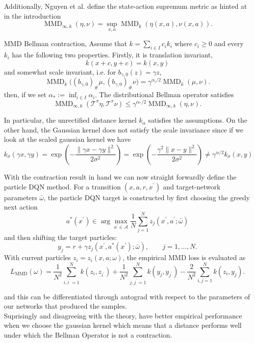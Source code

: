 \documentclass[12pt]{article}
\newcommand{\1}{\mathds{1}}
\newcommand{\A}{\mathcal{A}}
\newcommand{\T}{\mathcal{T}}
\newcommand{\MMD}{\operatorname{MMD}}
\newcommand{\norm}[1]{\lVert #1 \rVert}
\begin{document}
Additionally, Nguyen et al. define the state-action supremum metric as hinted at in the introduction 
\cite{nguyen2020moment}
$$
  \MMD_{\infty,k}(\eta,\nu)
  =
  \sup_{x,a}\MMD_k(\eta(x,a),\nu(x,a)).
$$

\begin{theorem}{MMD Bellman contraction, \cite[Theorem 2]{nguyen2020moment}}{}
Assume that $k=\sum_{i\in I}c_i k_i$ where $c_i\geq0$ and every $k_i$ has the following two properties. Firstly, it is translation invariant,
$$
  k(x+c,y+c)=k(x,y)
$$
and somewhat scale invariant, i.e. for $b_{\gamma,0}(z)=\gamma z$,
$$
  \MMD_k\bigl((b_{\gamma,0})_\#\mu,
  (b_{\gamma,0})_\#\nu\bigr)
  =
  \gamma^{\alpha_i/2}\MMD_k(\mu,\nu).
$$
then, if we set
$\alpha_*:=\inf_{i\in I}\alpha_i$. The distributional Bellman operator satisfies
$$
  \MMD_{\infty,k}(\T^\pi\eta,\T^\pi\nu)
  \leq
  \gamma^{\alpha_*/2}
  \MMD_{\infty,k}(\eta,\nu).
$$
\end{theorem}

In particular, the unrectified distance kernel $k_\alpha$ satisfies the assumptions. On the other hand, the Gaussian kernel does not satisfy the scale invariance since if we look at the scaled gaussian kernel we have 
$$
k_\sigma(\gamma x,\gamma y)=\exp\left(-\frac{\norm{\gamma x-\gamma y}^2}{2\sigma^2}\right)=\exp\left(-\frac{\gamma^2\norm{x-y}^2}{2\sigma^2}\right)\neq \gamma^{\alpha/2}k_\sigma(x,y)
$$

With the contraction result in hand we can now straight forwardly define the particle DQN method. 
For a transition $(x,a,r,x^{\prime})$ and target-network parameters
$\bar\omega$, the
particle DQN target is constructed by first choosing the greedy next action
$$
  a^*(x^{\prime})
  \in
  \arg\max_{a^{\prime}\in\A}
  \frac1N\sum_{j=1}^N
  z_j(x^{\prime},a^{\prime};\bar\omega)
$$
and then shifting the target particles:
$$
  y_j
  =
  r+\gamma z_j(x^{\prime},a^*(x^{\prime});\bar\omega),
  \qquad j=1,\ldots,N.
$$
With current particles $z_i=z_i(x,a;\omega)$, the empirical MMD loss is evaluated as
$$
  L_{\MMD}(\omega)
  =
  \frac1{N^2}\sum_{i,i^{\prime}=1}^N
  k(z_i,z_{i^{\prime}})
  +
  \frac1{N^2}\sum_{j,j^{\prime}=1}^N
  k(y_j,y_{j^{\prime}})
  -
  \frac2{N^2}\sum_{i,j=1}^Nk(z_i,y_j).
$$

and this can be differentiated through autograd with respect to the parameters of our networks that produced the samples. \\

Suprisingly and disagreeing with the theory, \cite{nguyen2020moment} have better empirical performance when we choose the gaussian kernel which means that a distance performs well under which the Bellman Operator is not a contraction. 
\end{document}
